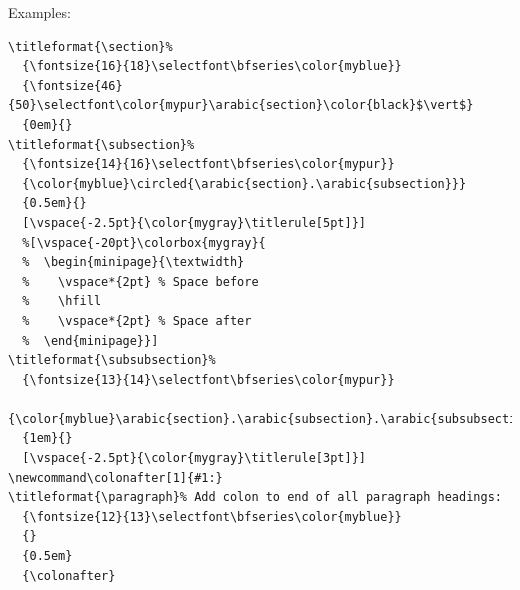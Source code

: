 \documentclass{article}
\begin{document}
\clearpage
Examples:
\begin{lstlisting}
\titleformat{\section}%
  {\fontsize{16}{18}\selectfont\bfseries\color{myblue}}
  {\fontsize{46}{50}\selectfont\color{mypur}\arabic{section}\color{black}$\vert$}
  {0em}{}
\titleformat{\subsection}%
  {\fontsize{14}{16}\selectfont\bfseries\color{mypur}}
  {\color{myblue}\circled{\arabic{section}.\arabic{subsection}}}
  {0.5em}{}
  [\vspace{-2.5pt}{\color{mygray}\titlerule[5pt]}]
  %[\vspace{-20pt}\colorbox{mygray}{
  %  \begin{minipage}{\textwidth}
  %    \vspace*{2pt} % Space before
  %    \hfill
  %    \vspace*{2pt} % Space after
  %  \end{minipage}}]
\titleformat{\subsubsection}%
  {\fontsize{13}{14}\selectfont\bfseries\color{mypur}}
  {\color{myblue}\arabic{section}.\arabic{subsection}.\arabic{subsubsection}}
  {1em}{}
  [\vspace{-2.5pt}{\color{mygray}\titlerule[3pt]}]
\newcommand\colonafter[1]{#1:}
\titleformat{\paragraph}% Add colon to end of all paragraph headings:
  {\fontsize{12}{13}\selectfont\bfseries\color{myblue}}
  {}
  {0.5em}
  {\colonafter}
\end{lstlisting}
\end{document}
